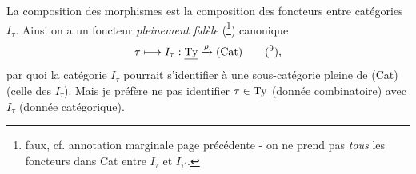 La composition des morphismes est la composition des foncteurs entre catégories $I_\tau$. Ainsi on a un foncteur \textit{pleinement fidèle} (\footnote[8]{faux, cf. annotation marginale page précédente - on ne prend pas \textit{tous} les foncteurs dans Cat entre $I_\tau$ et $I_{\tau'}$.}) canonique
\[
\tau \longmapsto I_\tau : \uTy \xrightarrow{\rho} (\Cat) \qquad \text{(\footnotemark[9]),}
\]
par quoi la catégorie $I_\tau$ pourrait s'identifier à une sous-catégorie pleine de (Cat) (celle des $I_\tau$). Mais je préfère ne pas identifier $\tau\in\mathrm{Ty}$ (donnée combinatoire) avec $I_\tau$ (donnée catégorique).

